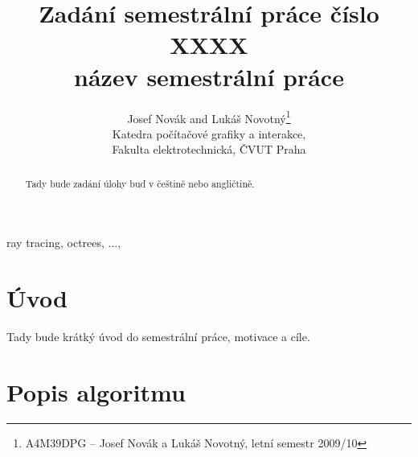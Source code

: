 \documentclass[report,11pt]{elsarticle}
\begin{document}
\begin{frontmatter}

\title{Zadání semestrální práce číslo XXXX\\ název semestrální práce}

\author{Josef Novák and Lukáš Novotný\footnote{A4M39DPG -- Josef Novák a Lukáš Novotný, letní semestr 2009/10}\\
Katedra počítačové grafiky a interakce,\\ Fakulta elektrotechnická, ČVUT Praha
}

\date{}


\begin{abstract}
  Tady bude zadání úlohy buď v češtině nebo angličtině.
\end{abstract}

\begin{keyword}
ray tracing, octrees, ...,
\end{keyword}

\end{frontmatter}



\section{\label{SEC:Intro}Úvod}

Tady bude krátký úvod do semestrální práce, motivace a cíle.

\section{\label{SEC:Description}Popis algoritmu}
\end{document}
